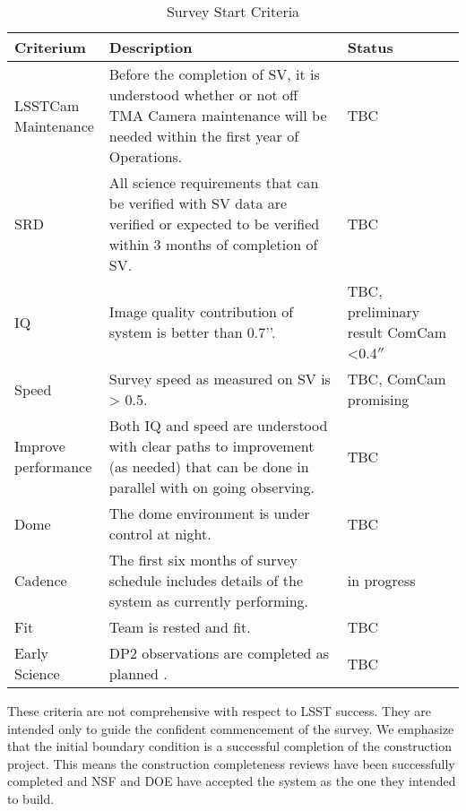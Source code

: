 \begin{table}[]
\renewcommand{\arraystretch}{2}
\small
\centering
\caption{Survey Start Criteria}\label{tab:criteria}
\begin{tabular}{|p{1in}|p{4in}|p{1.0in}|}
\hline
Criterium & Description& Status \\
\hline \hline

\makecell[l]{LSSTCam\\ Maintenance} & Before the completion of SV, it is understood whether or not off TMA Camera maintenance will be needed within the first year of Operations.& TBC \\\hline  
SRD &All science requirements that can be verified with SV data are verified or expected to be verified within 3 months of completion of SV. & TBC \\\hline
IQ& Image quality contribution of system is better than 0.7’’. & \makecell[l]{TBC, \\preliminary \\result \\ComCam <0.4$''$}\\\hline
Speed & Survey speed as measured on SV is > 0.5. & TBC, ComCam promising\\\hline
\makecell[l]{Improve\\ performance} & Both IQ and speed are understood with clear paths to improvement (as needed) that can be done in parallel with on going observing.& TBC \\\hline
Dome & The dome environment is under control at night. & TBC\\\hline
Cadence& The first six months of survey schedule includes details of the system as currently performing.& in progress\\\hline
Fit & Team is rested and fit. & TBC\\\hline
Early Science&DP2 observations are completed as planned \citep{RTN-011}.& TBC \\

\hline
\end{tabular}
\end{table}

These criteria are not comprehensive with respect to LSST success. They are intended only to guide the confident commencement of the survey. We emphasize that the initial boundary condition is a successful completion of the construction project. This means the construction completeness reviews have been successfully completed and NSF and DOE have accepted the system as the one they intended to build.

